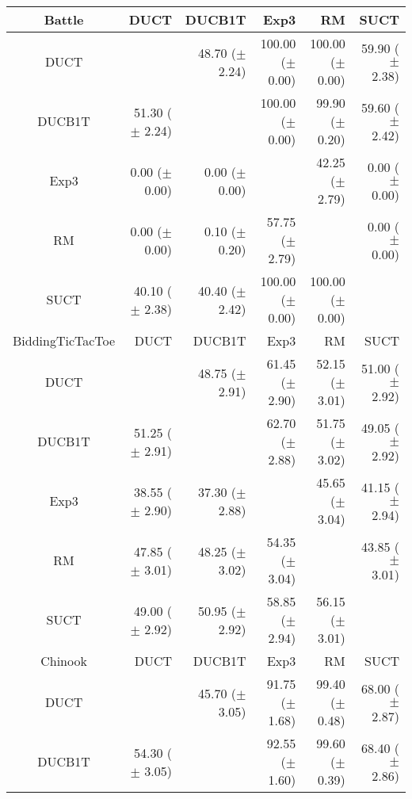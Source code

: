 \documentclass{article}
\begin{document}
\begin{table}
\begin{center}
\begin{tabular}{|c|rrrrr|}

\hline
\hline
         Battle   &       DUCT   &     DUCB1T   &       Exp3   &         RM   &       SUCT   \\
\hline
           DUCT    &              & 48.70 ($\pm$ 2.24)   & 100.00 ($\pm$ 0.00)   & 100.00 ($\pm$ 0.00)   & 59.90 ($\pm$ 2.38)   \\
         DUCB1T    & 51.30 ($\pm$ 2.24)   &              & 100.00 ($\pm$ 0.00)   & 99.90 ($\pm$ 0.20)   & 59.60 ($\pm$ 2.42)   \\
           Exp3    & 0.00 ($\pm$ 0.00)   & 0.00 ($\pm$ 0.00)   &              & 42.25 ($\pm$ 2.79)   & 0.00 ($\pm$ 0.00)   \\
             RM    & 0.00 ($\pm$ 0.00)   & 0.10 ($\pm$ 0.20)   & 57.75 ($\pm$ 2.79)   &              & 0.00 ($\pm$ 0.00)   \\
           SUCT    & 40.10 ($\pm$ 2.38)   & 40.40 ($\pm$ 2.42)   & 100.00 ($\pm$ 0.00)   & 100.00 ($\pm$ 0.00)   &              \\
\hline
\hline
BiddingTicTacToe   &       DUCT   &     DUCB1T   &       Exp3   &         RM   &       SUCT   \\
\hline
           DUCT    &              & 48.75 ($\pm$ 2.91)   & 61.45 ($\pm$ 2.90)   & 52.15 ($\pm$ 3.01)   & 51.00 ($\pm$ 2.92)   \\
         DUCB1T    & 51.25 ($\pm$ 2.91)   &              & 62.70 ($\pm$ 2.88)   & 51.75 ($\pm$ 3.02)   & 49.05 ($\pm$ 2.92)   \\
           Exp3    & 38.55 ($\pm$ 2.90)   & 37.30 ($\pm$ 2.88)   &              & 45.65 ($\pm$ 3.04)   & 41.15 ($\pm$ 2.94)   \\
             RM    & 47.85 ($\pm$ 3.01)   & 48.25 ($\pm$ 3.02)   & 54.35 ($\pm$ 3.04)   &              & 43.85 ($\pm$ 3.01)   \\
           SUCT    & 49.00 ($\pm$ 2.92)   & 50.95 ($\pm$ 2.92)   & 58.85 ($\pm$ 2.94)   & 56.15 ($\pm$ 3.01)   &              \\
\hline
\hline
        Chinook   &       DUCT   &     DUCB1T   &       Exp3   &         RM   &       SUCT   \\
\hline
           DUCT    &              & 45.70 ($\pm$ 3.05)   & 91.75 ($\pm$ 1.68)   & 99.40 ($\pm$ 0.48)   & 68.00 ($\pm$ 2.87)   \\
         DUCB1T    & 54.30 ($\pm$ 3.05)   &              & 92.55 ($\pm$ 1.60)   & 99.60 ($\pm$ 0.39)   & 68.40 ($\pm$ 2.86)   \\

\end{tabular}
\end{center}
\end{table}
\end{document}
